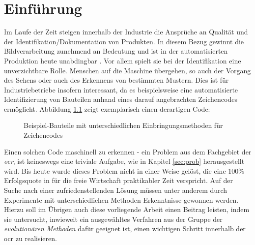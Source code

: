 \chapter{Einführung}
\label{sec:intro}
	
	Im Laufe der Zeit steigen innerhalb der Industrie die Ansprüche an Qualität und der Identifikation/Dokumentation von Produkten. In diesem Bezug gewinnt die Bildverarbeitung zunehmend an Bedeutung und ist in der automatisierten Produktion heute unabdingbar \cite[S. x]{indust-imgproc}. 
	Vor allem spielt sie bei der Identifikation eine unverzichtbare Rolle. 
	Menschen auf die Maschine übergehen, so auch der Vorgang des Sehens oder 
	auch des Erkennens von bestimmten Mustern. Dies ist für Industriebetriebe 
	insofern interessant, da es beispielsweise eine automatisierte 
	Identifizierung von Bauteilen anhand eines darauf angebrachten 
	Zeichencodes ermöglicht. Abbildung \ref{fig:example-code} zeigt 
	exemplarisch einen derartigen Code:
	\begin{figure}[h]
		\centering
		\qquad
		\caption{Beispiel-Bauteile mit unterschiedlichen Einbringungsmethoden für Zeichencodes}
		\label{fig:example-code}
	\end{figure}

	Einen solchen Code maschinell zu erkennen - ein Problem aus dem Fachgebiet 
	der \textit{\gls{ocr}}, ist keineswegs eine 
	triviale Aufgabe, wie in Kapitel \ref{sec:prob} herausgestellt wird. Bis 
	heute wurde dieses Problem nicht in einer Weise gelöst, die eine 100\% 
	Erfolgsquote in für die freie Wirtschaft praktikabler Zeit verspricht. Auf 
	der Suche nach einer zufriedenstellenden Lösung müssen unter anderem durch 
	Experimente mit unterschiedlichen Methoden Erkenntnisse gewonnen werden. 
	Hierzu soll im Übrigen auch diese vorliegende Arbeit einen Beitrag leisten, 
	indem sie untersucht, inwieweit ein ausgewähltes Verfahren aus der Gruppe 
	der \textit{evolutionären Methoden} dafür geeignet ist, einen wichtigen 
	Schritt innerhalb der \gls{ocr} zu realisieren. \\
	
